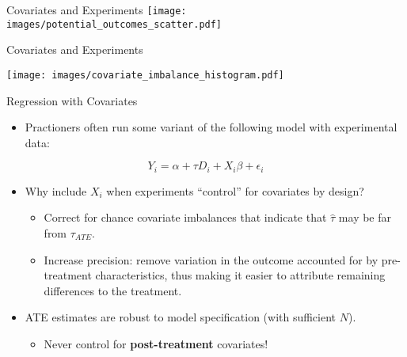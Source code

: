 \documentclass{beamer}
\numberwithin{equation}{section}
\begin{document}
\begin{frame}{Covariates and Experiments}
\centering
    \texttt{[image: images/potential\_outcomes\_scatter.pdf]}
\end{frame}


\begin{frame}{Covariates and Experiments}

\centering
    \texttt{[image: images/covariate\_imbalance\_histogram.pdf]}
\end{frame}

\begin{frame}{Regression with Covariates}

\begin{itemize}
\itemsep1pt\parskip0pt
\item
  Practioners often run some variant of the following model with
  experimental data:
\end{itemize}

\[ Y_i = \alpha + \tau D_i + X_i\beta + \epsilon_i \]

\begin{itemize}
\itemsep1pt\parskip0pt
\item
  Why include $X_i$ when experiments ``control'' for covariates by
  design? \pause

  \begin{itemize}
  \itemsep1pt\parskip0pt 
  \item
    Correct for chance covariate imbalances that indicate that
    $\hat{\tau}$ may be far from $\tau_{ATE}$. \pause
  \item
    Increase precision: remove variation in the outcome accounted for by
    pre-treatment characteristics, thus making it easier to attribute
    remaining differences to the treatment. \pause
  \end{itemize}
\item  ATE estimates are robust to model specification (with sufficient $N$).
  \begin{itemize}
  \itemsep1pt\parskip0pt
  \item
    Never control for \textbf{post-treatment} covariates!
  \end{itemize}
\end{itemize}

\end{frame}
\end{document}

